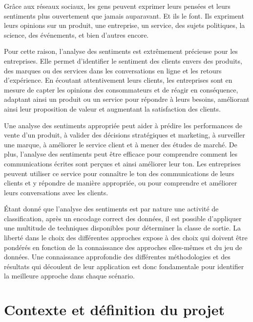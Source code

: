 Grâce aux réseaux sociaux, les gens peuvent exprimer leurs pensées et leurs sentiments plus ouvertement que jamais auparavant. Et ils le font. Ils expriment leurs opinions sur un produit, une entreprise, un service, des sujets politiques, la science, des événements, et bien d'autres encore.\par

Pour cette raison, l'analyse des sentiments est extrêmement précieuse pour les entreprises. Elle permet d'identifier le sentiment des clients envers des produits, des marques ou des services dans les conversations en ligne et les retours d'expérience. En écoutant attentivement leurs clients, les entreprises sont en mesure de capter les opinions des consommateurs et de réagir en conséquence, adaptant ainsi un produit ou un service pour répondre à leurs besoins, améliorant ainsi leur proposition de valeur et augmentant la satisfaction des clients.\par

Une analyse des sentiments appropriée peut aider à prédire les performances de vente d'un produit, à valider des décisions stratégiques et marketing, à surveiller une marque, à améliorer le service client et à mener des études de marché. De plus, l'analyse des sentiments peut être efficace pour comprendre comment les communications écrites sont perçues et ainsi améliorer leur ton. Les entreprises peuvent utiliser ce service pour connaître le ton des communications de leurs clients et y répondre de manière appropriée, ou pour comprendre et améliorer leurs conversations avec les clients.\par

Étant donné que l'analyse des sentiments est par nature une activité de classification, après un encodage correct des données, il est possible d'appliquer une multitude de techniques disponibles pour déterminer la classe de sortie. La liberté dans le choix des différentes approches expose à des choix qui doivent être pondérés en fonction de la connaissance des approches elles-mêmes et du jeu de données. Une connaissance approfondie des différentes méthodologies et des résultats qui découlent de leur application est donc fondamentale pour identifier la meilleure approche dans chaque scénario.\par



\section{Contexte et définition du projet}
